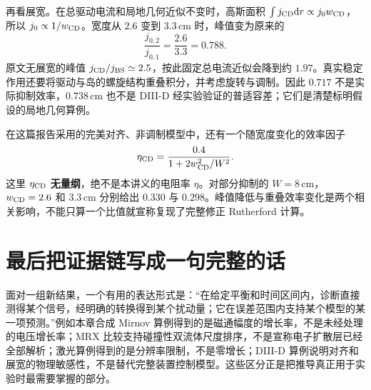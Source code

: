 再看展宽。在总驱动电流和局地几何近似不变时，高斯面积 $\int j_{\rm CD}\mathrm d r\propto j_0w_{\rm CD}$，所以 $j_0\propto1/w_{\rm CD}$。宽度从 $2.6$ 变到 $3.3\,\mathrm{cm}$ 时，峰值变为原来的
\begin{equation}
 \frac{j_{0,2}}{j_{0,1}}=\frac{2.6}{3.3}=0.788.
\end{equation}
原文无展宽的峰值 $j_{\rm CD}/j_{\rm BS}\simeq2.5$，按此固定总电流近似会降到约 $1.97$。真实稳定作用还要将驱动与岛的螺旋结构重叠积分，并考虑旋转与调制。因此 $0.717$ 不是实际抑制效率，$0.738\,\mathrm{cm}$ 也不是 DIII-D 经实验验证的普适容差；它们是清楚标明假设的局地几何算例。

在这篇报告采用的完美对齐、非调制模型中，还有一个随宽度变化的效率因子
\begin{equation}
 \eta_{\rm CD}=\frac{0.4}{1+2w_{\rm CD}^2/W^2}.
\end{equation}
这里 $\eta_{\rm CD}$ \textbf{无量纲}，绝不是本讲义的电阻率 $\eta$。对部分抑制的 $W=8\,\mathrm{cm}$，$w_{\rm CD}=2.6$ 和 $3.3\,\mathrm{cm}$ 分别给出 $0.330$ 与 $0.298$。峰值降低与重叠效率变化是两个相关影响，不能只算一个比值就宣称复现了完整修正 Rutherford 计算。\citep{TMPetty2003}

\section{最后把证据链写成一句完整的话}

面对一组新结果，一个有用的表达形式是：“在给定平衡和时间区间内，诊断直接测得某个信号，经明确的转换得到某个扰动量；它在误差范围内支持某个模型的某一项预测。”例如本章合成 Mirnov 算例得到的是磁通幅度的增长率，不是未经处理的电压增长率；MRX 比较支持碰撞性双流体尺度排序，不是宣称电子扩散层已经全部解析；激光算例得到的是分辨率限制，不是零增长；DIII-D 算例说明对齐和展宽的物理敏感性，不是替代完整装置控制模型。这些区分正是把推导真正用于实验时最需要掌握的部分。
